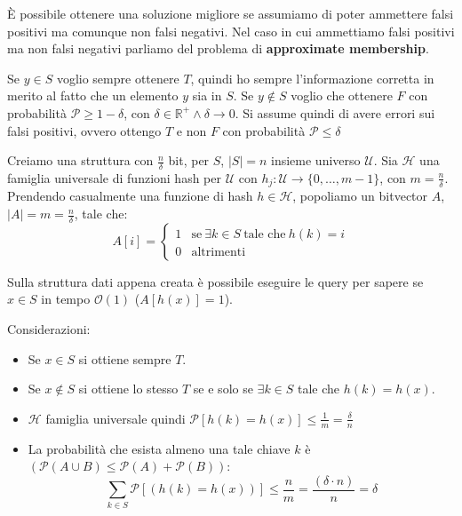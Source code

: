 È possibile ottenere una soluzione migliore se assumiamo di poter ammettere falsi positivi ma comunque non falsi negativi. Nel caso in cui ammettiamo falsi positivi ma non falsi negativi parliamo del problema di \textbf{approximate membership}. 

Se $y \in S$ voglio sempre ottenere $T$, quindi ho sempre l'informazione corretta in merito al fatto che un elemento $y$ sia in $S$. Se $y \notin S$ voglio che ottenere $F$ con probabilità $\mathcal{P} \geq 1 - \delta$, con $\delta \in \mathbb{R}^{+} \land \delta \to 0$. Si assume quindi di avere errori sui falsi positivi, ovvero ottengo $T$ e non $F$ con probabilità $\mathcal{P} \leq \delta$

Creiamo una struttura con $\frac{n}{\delta}$ bit, per $S$, $|S| = n$ insieme universo $\mathcal{U}$. Sia $\mathcal{H}$ una famiglia universale di funzioni hash per $\mathcal{U}$ con $h_j : \mathcal{U} \to \{0, \dots, m - 1\}$, con $m = \frac{n}{\delta}$. Prendendo casualmente una funzione di hash $h \in \mathcal{H}$, popoliamo un bitvector $A$, $|A| = m = \frac{n}{\delta}$, tale che:
\begin{equation}
    A[i] = \begin{cases}
        1 & \text{se} \ \exists k \in S \ \text{tale che} \ h(k) = i\\
        0 & \text{altrimenti}
    \end{cases}
\end{equation}

Sulla struttura dati appena creata è possibile eseguire le query per sapere se $x \in S$ in tempo $\mathcal{O}(1)$ ($A[h(x)] = 1$).

Considerazioni:
\begin{itemize}
    \item Se $x \in S$ si ottiene sempre $T$.
    \item Se $x \notin S$ si ottiene lo stesso $T$ se e solo se $\exists k \in S$ tale che $h(k) = h(x)$.
    \item $\mathcal{H}$ famiglia universale quindi $\mathcal{P}[h(k) = h(x)] \leq \frac{1}{m} = \frac{\delta}{n}$
    \item La probabilità che esista almeno una tale chiave $k$ è $(\mathcal{P}(A \cup B) \leq \mathcal{P}(A) + \mathcal{P}(B))$:
    \begin{equation}
        \sum_{k \in S} \mathcal{P}[(h(k) = h(x))] \leq \frac{n}{m} = \frac{(\delta \cdot n)}{n} = \delta
    \end{equation}
\end{itemize}
